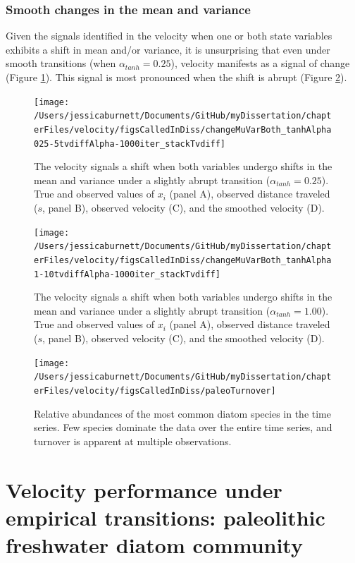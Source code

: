 \documentclass[12pt,twoside,openany]{reedthesis}
\begin{document}
\hypertarget{smooth-changes-in-the-mean-and-variance}{%
\subsubsection{Smooth changes in the mean and variance}\label{smooth-changes-in-the-mean-and-variance}}

Given the signals identified in the velocity when one or both state variables exhibits a shift in mean and/or variance, it is unsurprising that even under smooth transitions (when \(\alpha_{tanh} = 0.25\)), velocity manifests as a signal of change (Figure \ref{fig:muVarBoth25}). This signal is most pronounced when the shift is abrupt (Figure \ref{fig:muVarBoth1}).
\begin{figure}[bth]

{\centering \texttt{[image: /Users/jessicaburnett/Documents/GitHub/myDissertation/chapterFiles/velocity/figsCalledInDiss/changeMuVarBoth\_tanhAlpha025-5tvdiffAlpha-1000iter\_stackTvdiff]} 

}

\caption{The velocity signals a shift when both variables undergo shifts in the mean and variance under a slightly abrupt transition ($\alpha_{tanh}=0.25$). True and observed values of $x_i$ (panel A), observed distance traveled ($s$, panel B), observed velocity (C), and the smoothed velocity (D).}\label{fig:muVarBoth25}
\end{figure}
\newpage
\begin{figure}[bth]

{\centering \texttt{[image: /Users/jessicaburnett/Documents/GitHub/myDissertation/chapterFiles/velocity/figsCalledInDiss/changeMuVarBoth\_tanhAlpha1-10tvdiffAlpha-1000iter\_stackTvdiff]} 

}

\caption{The velocity signals a shift when both variables undergo shifts in the mean and variance under a slightly abrupt transition ($\alpha_{tanh}=1.00$). True and observed values of $x_i$ (panel A), observed distance traveled ($s$, panel B), observed velocity (C), and the smoothed velocity (D).}\label{fig:muVarBoth1}
\end{figure}
\newpage

\newpage
\begin{figure}[bth]

{\centering \texttt{[image: /Users/jessicaburnett/Documents/GitHub/myDissertation/chapterFiles/velocity/figsCalledInDiss/paleoTurnover]} 

}

\caption{Relative abundances of the most common diatom species in the time series. Few species dominate the data over the entire time series, and turnover is apparent at multiple observations.}\label{fig:paleoTurnover}
\end{figure}
\hypertarget{velocity-performance-under-empirical-transitions-paleolithic-freshwater-diatom-community}{%
\section{Velocity performance under empirical transitions: paleolithic freshwater diatom community}\label{velocity-performance-under-empirical-transitions-paleolithic-freshwater-diatom-community}}
\end{document}
